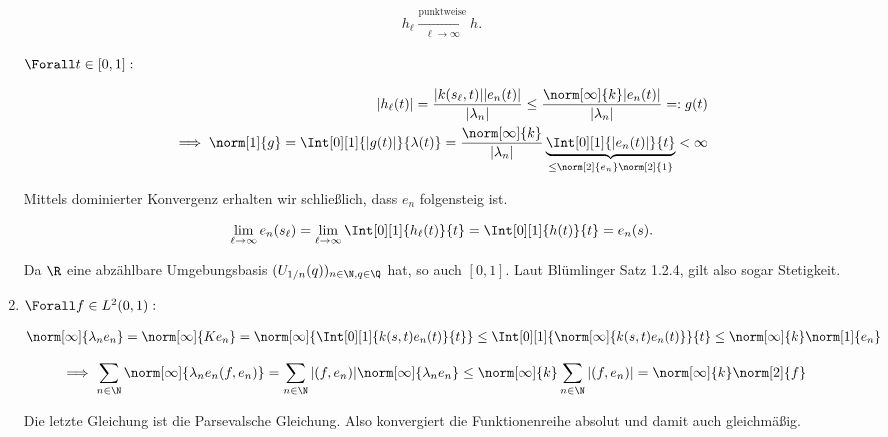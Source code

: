 \begin{solution}
\begin{enumerate}[label = (\alph*)]
  \begin{align*}
    h_\ell
    \xrightarrow
    [\ell \to \infty]
    {\text{punktweise}}
    h.
  \end{align*}

  $\Forall t \in [0, 1]:$

  \begin{align*}
    |h_\ell(t)|
    =
    \frac
    {
      |k(s_\ell, t)|
      |e_n(t)|
    }
    {|\lambda_n|}
    \leq
    \frac
    {
      \norm[\infty]{k}
      |e_n(t)|
    }
    {|\lambda_n|}
    =:
    g(t) \\
    \implies
    \norm[1]{g}
    =
    \Int[0][1]
    {|g(t)|}{\lambda(t)}
    =
    \frac
    {\norm[\infty]{k}}
    {|\lambda_n|}
    \underbrace
    {
      \Int[0][1]
      {|e_n(t)|}{t}
    }_{
      \leq
      \norm[2]{e_n}
      \norm[2]{1}
    }
    < \infty
  \end{align*}

  Mittels dominierter Konvergenz
  erhalten wir schließlich, dass $e_n$ folgensteig ist.

  \begin{align*}
    \lim_{\ell \to \infty}
    e_n(s_\ell)
    =
    \lim_{\ell \to \infty}
    \Int[0][1]{h_\ell(t)}{t}
    =
    \Int[0][1]{h(t)}{t}
    =
    e_n(s).
  \end{align*}


  Da $\R$ eine abzählbare Umgebungsbasis $(U_{1/n}(q))_{n \in \N, q \in \Q}$ hat, so auch $[0, 1]$.
  Laut Blümlinger Satz 1.2.4, gilt also sogar Stetigkeit.

  \item
  $\Forall f \in L^2(0, 1):$

  \begin{align*}
    \norm[\infty]
    {\lambda_n e_n}
    =
    \norm[\infty]
    {K e_n}
    =
    \norm[\infty]
    {
      \Int[0][1]
      {k(s, t) e_n(t)}{t}
    }
    \leq
    \Int[0][1]
    {
      \norm[\infty]
      {k(s, t) e_n(t)}
    }{t}
    \leq
    \norm[\infty]{k}
    \norm[1]{e_n}
  \end{align*}

  \begin{align*}
    \implies
    \sum_{n \in \N}
    \norm[\infty]{\lambda_n e_n (f, e_n)}
    & =
    \sum_{n \in \N}
    |(f, e_n)|
    \norm[\infty]
    {\lambda_n e_n}
    \leq
    \norm[\infty]{k}
    \sum_{n \in \N}
    |(f, e_n)|
    =
    \norm[\infty]{k}
    \norm[2]{f}
  \end{align*}

  Die letzte Gleichung ist die Parsevalsche Gleichung.
  Also konvergiert die Funktionenreihe absolut und damit auch gleichmäßig. \\

\end{enumerate}

\end{solution}
